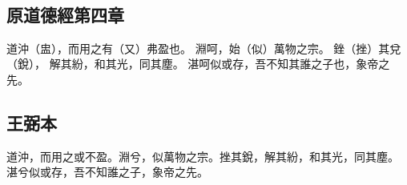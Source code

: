 ﻿%
%

\chapter{~}

\section{原道德經第四章}

\begin{withgezhu}

\zhsong


\colorbox{adding-color}{道沖（\textcolor{tongjia-color}{盅}），而用之有（\textcolor{tongjia-color}{又}）弗}盈也。
淵呵，始（\textcolor{tongjia-color}{似}）萬物之宗。
銼（\textcolor{tongjia-color}{挫}）其\colorbox{adding-color}{兌（\textcolor{tongjia-color}{銳}）}，
解其紛，和其光，同\colorbox{adding-color}{其塵}。
\colorbox{adding-color}{湛呵似}或存，吾不知\colorbox{adding-color}{其誰之}子也，象帝之先。

\end{withgezhu}

\section{王弼本}

\begin{withgezhu}

\zhsong

道沖，而用之或不盈。淵兮，似萬物之宗。挫其銳，解其紛，和其光，同其塵。
湛兮似或存，吾不知誰之子，象帝之先。

\end{withgezhu}
